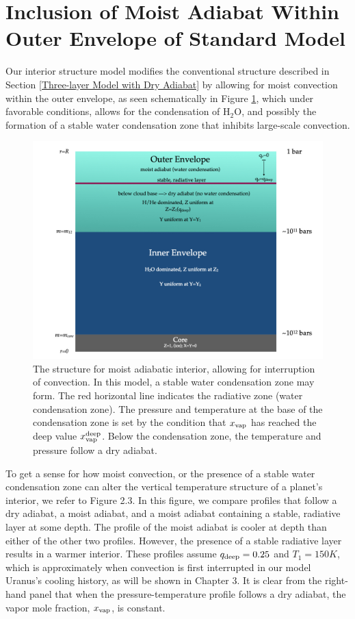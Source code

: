\documentclass[11pt]{ucscthesisbs}
\begin{document}
\section{Inclusion of Moist Adiabat Within Outer Envelope of Standard Model}
Our interior structure model modifies the conventional structure described in Section \ref{Three-layer Model with Dry Adiabat} by allowing for moist convection within the outer envelope, as seen schematically in Figure \ref{fig:moist_interior}, which under favorable conditions, allows for the condensation of H$_{2}$O, and possibly the formation of a stable water condensation zone that inhibits large-scale convection. 
\begin{figure}[ht!]
 \centerline{
  \includegraphics[width=6.0in]{figures/structure_schematic/structure_schematic.002.jpeg}
 }
\caption[Interior Structure for Moist Adiabat]
{The structure for moist adiabatic interior, allowing for interruption of convection. In this model, a stable water condensation zone may form. The red horizontal line indicates the radiative zone (water condensation zone). The pressure and temperature at the base of the condensation zone is set by the condition that $x_{\rm vap}$ has reached the deep value $x_{\rm vap}^{\rm deep}$. Below the condensation zone, the temperature and pressure follow a dry adiabat.}
\label{fig:moist_interior}
\end{figure}
To get a sense for how moist convection, or the presence of a stable water condensation zone can alter the vertical temperature structure of a planet's interior, we refer to Figure 2.3. In this figure, we compare profiles that follow a dry adiabat, a moist adiabat, and a moist adiabat containing a stable, radiative layer at some depth. The profile of the moist adiabat is cooler at depth than either of the other two profiles. However, the presence of a stable radiative layer results in a warmer interior. These profiles assume $q_{\rm deep} = 0.25$ and $T_{1} = 150K$, which is approximately when convection is first interrupted in our model Uranus's cooling history, as will be shown in Chapter 3. It is clear from the right-hand panel that when the pressure-temperature profile follows a dry adiabat, the vapor mole fraction, $x_{\rm vap}$, is constant.
\end{document}
